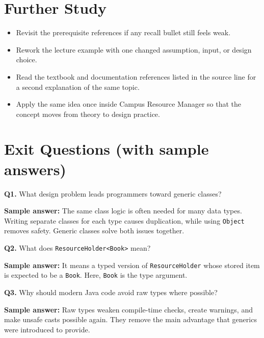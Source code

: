 \documentclass[11pt]{article}
\begin{document}
\section{Further Study}
\begin{itemize}
  \item Revisit the prerequisite references if any recall bullet still feels weak.
  \item Rework the lecture example with one changed assumption, input, or design choice.
  \item Read the textbook and documentation references listed in the source line for a second explanation of the same topic.
  \item Apply the same idea once inside Campus Resource Manager so that the concept moves from theory to design practice.
\end{itemize}
\notesources{\OOPSUnitIVSources}

\section{Exit Questions (with sample answers)}
\textbf{Q1.} What design problem leads programmers toward generic classes?\par
\textbf{Sample answer:} The same class logic is often needed for many data types. Writing separate classes for each type causes duplication, while using \texttt{Object} removes safety. Generic classes solve both issues together.

\vspace{0.6em}
\textbf{Q2.} What does \texttt{ResourceHolder<Book>} mean?\par
\textbf{Sample answer:} It means a typed version of \texttt{ResourceHolder} whose stored item is expected to be a \texttt{Book}. Here, \texttt{Book} is the type argument.

\vspace{0.6em}
\textbf{Q3.} Why should modern Java code avoid raw types where possible?\par
\textbf{Sample answer:} Raw types weaken compile-time checks, create warnings, and make unsafe casts possible again. They remove the main advantage that generics were introduced to provide.
\end{document}
